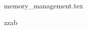 \documentclass{exam}
\begin{document}
     {memory_management.tex}

\begin{questions}

                                    \printanswers




         \question  zzab



\end{questions}
\end{document}
